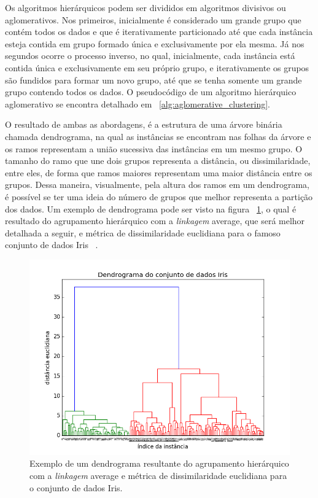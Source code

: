 Os algoritmos hierárquicos podem ser divididos em algoritmos divisivos ou aglomerativos. Nos primeiros, inicialmente é considerado um grande grupo que contém todos os dados e que é iterativamente particionado até que cada instância esteja contida em grupo formado única e exclusivamente por ela mesma. Já nos segundos ocorre o processo inverso, no qual, inicialmente, cada instância está contida única e exclusivamente em seu próprio grupo, e iterativamente os grupos são fundidos para formar um novo grupo, até que se tenha somente um grande grupo contendo todos os dados. O pseudocódigo de um algoritmo hierárquico aglomerativo se encontra detalhado em ~\ref{alg:aglomerative_clustering}.

O resultado de ambas as abordagens, é a estrutura de uma árvore binária chamada dendrograma, na qual as instâncias se encontram nas folhas da árvore e os ramos representam a união sucessiva das instâncias em um mesmo grupo. O tamanho do ramo que une dois grupos representa a distância, ou dissimilaridade, entre eles, de forma que ramos maiores representam uma maior distância entre os grupos. Dessa maneira, visualmente, pela altura dos ramos em um dendrograma, é possível se ter uma ideia do número de grupos que melhor representa a partição dos dados. Um exemplo de dendrograma pode ser visto na figura ~\ref{fig:dendrograma_exemplo}, o qual é resultado do agrupamento hierárquico com a \emph{linkagem} average, que será melhor detalhada a seguir, e métrica de dissimilaridade euclidiana para o famoso conjunto de dados Iris ~\parencite{Iris}.

\begin{figure}[h!]
	\includegraphics[width=\linewidth]{figuras/dendrograma_exemplo.png}
	\caption{Exemplo de um dendrograma resultante do agrupamento hierárquico com a \emph{linkagem} average e métrica de dissimilaridade euclidiana para o conjunto de dados Iris.}
	\label{fig:dendrograma_exemplo}
\end{figure}

